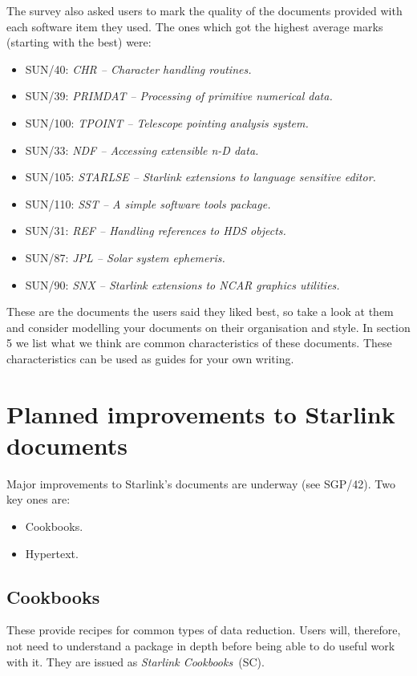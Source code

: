 \documentclass[twoside,11pt]{article}
\newcommand{\htmladdnormallink}[2]{#1}
\newcommand{\htmlref}[2]{#1}
\newcommand{\xref}[3]{#1}
\begin{document}
The survey also asked users to mark the quality of the documents provided with
each software item they used.
The ones which got the highest average marks (starting with the best) were:
\begin{itemize}
\item \xref{SUN/40}{sun40}{}: {\em CHR -- Character handling routines.}
\item \xref{SUN/39}{sun39}{}: {\em PRIMDAT -- Processing of primitive numerical data.}
\item SUN/100: {\em TPOINT -- Telescope pointing analysis system.}
\item \xref{SUN/33}{sun33}{}: {\em NDF -- Accessing extensible n-D data.}
\item SUN/105: {\em STARLSE -- Starlink extensions to language sensitive editor.}
\item SUN/110: {\em SST -- A simple software tools package.}
\item \xref{SUN/31}{sun31}{}: {\em REF -- Handling references to HDS objects.}
\item \xref{SUN/87}{sun87}{}: {\em JPL -- Solar system ephemeris.}
\item SUN/90: {\em SNX -- Starlink extensions to NCAR graphics utilities.}
\end{itemize}
These are the documents the users said they liked best, so take a look at them
and consider modelling your documents on their organisation and style.
In \htmlref{section 5}{GoodStyle} we list what we think are common
characteristics of these documents.
These characteristics can be used as guides for your own writing.

\section{Planned improvements to Starlink documents}

Major improvements to Starlink's documents are underway
(see \xref{SGP/42}{sgp42}{}).
Two key ones are:

\begin{itemize}
\item Cookbooks.
\item Hypertext.
\end{itemize}

\subsection{Cookbooks}

These provide recipes for common types of data reduction.
Users will, therefore, not need to understand a package in depth before being
able to do useful work with it.
They are issued as {\em Starlink Cookbooks}\,
(\htmladdnormallink{SC}{http://star-www.rl.ac.uk/sc.html}).
\end{document}
